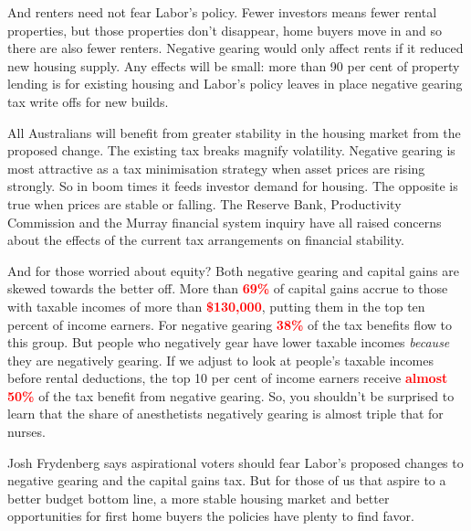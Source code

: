 \documentclass[b5paper,11pt]{article}\usepackage[]{graphicx}\usepackage[]{color}
\begin{document}
And renters need not fear Labor's policy. Fewer investors means fewer
rental properties, but those properties don't disappear, home buyers
move in and so there are also fewer renters. Negative gearing would only
affect rents if it reduced new housing supply. Any effects will be
small: more than 90 per cent of property lending is for existing housing
and Labor's policy leaves in place negative gearing tax write offs for
new builds.

All Australians will benefit from greater stability in the housing
market from the proposed change. The existing tax breaks magnify
volatility. Negative gearing is most attractive as a tax minimisation
strategy when asset prices are rising strongly. So in boom times it
feeds investor demand for housing. The opposite is true when prices are
stable or falling. The Reserve Bank, Productivity Commission and the
Murray financial system inquiry have all raised concerns about the
effects of the current tax arrangements on financial stability.

And for those worried about equity? Both negative gearing and capital
gains are skewed towards the better off. More than \textcolor{red}{\textbf{69\%}} of
capital gains accrue to those with taxable incomes of more than \textcolor{red}{\textbf{\$130,000}},
putting them in the top ten percent of income earners. For negative
gearing \textcolor{red}{\textbf{38\%}} of the tax benefits flow to this group. But people
who negatively gear have lower taxable incomes \emph{because} they are
negatively gearing. If we adjust to look at people's taxable incomes
before rental deductions, the top 10 per cent of income earners receive
\textcolor{red}{\textbf{almost 50\%}} of the tax benefit from negative gearing. So, you
shouldn't be surprised to learn that the share of anesthetists negatively gearing is almost
triple that for nurses.

Josh Frydenberg says aspirational voters should fear Labor's proposed
changes to negative gearing and the capital gains tax. But for those of
us that aspire to a better budget bottom line, a more stable housing
market and better opportunities for first home buyers the policies have
plenty to find favor.
\end{document}

